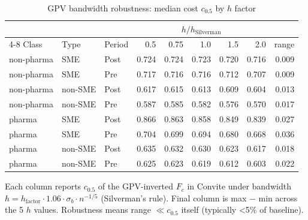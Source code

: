 \begin{table}[htbp]
\centering
\begin{threeparttable}
\caption{GPV bandwidth robustness: median cost $c_{0.5}$ by $h$ factor}
\label{tab:v3_bandwidth_grid}
\small
\begin{tabular}{lllrrrrrr}
\toprule
 & & & \multicolumn{5}{c}{$h / h_{\text{Silverman}}$} & \\
\cmidrule(lr){4-8}
Class & Type & Period & 0.5 & 0.75 & 1.0 & 1.5 & 2.0 & range \\
\midrule
non-pharma & SME & Post & 0.724 & 0.724 & 0.723 & 0.720 & 0.716 & 0.009 \\
non-pharma & SME & Pre & 0.717 & 0.716 & 0.716 & 0.712 & 0.707 & 0.009 \\
non-pharma & non-SME & Post & 0.617 & 0.615 & 0.613 & 0.609 & 0.604 & 0.013 \\
non-pharma & non-SME & Pre & 0.587 & 0.585 & 0.582 & 0.576 & 0.570 & 0.017 \\
pharma & SME & Post & 0.866 & 0.863 & 0.858 & 0.849 & 0.839 & 0.027 \\
pharma & SME & Pre & 0.704 & 0.699 & 0.694 & 0.680 & 0.668 & 0.036 \\
pharma & non-SME & Post & 0.635 & 0.632 & 0.630 & 0.623 & 0.617 & 0.018 \\
pharma & non-SME & Pre & 0.625 & 0.623 & 0.619 & 0.612 & 0.603 & 0.022 \\
\bottomrule
\end{tabular}
\begin{tablenotes}\footnotesize
\item Each column reports $c_{0.5}$ of the GPV-inverted $F_c$ in
Convite under bandwidth $h = h_{\text{factor}} \cdot
1.06 \cdot \sigma_b \cdot n^{-1/5}$ (Silverman's rule).
Final column is max $-$ min across the 5 $h$ values. Robustness
means range $\ll c_{0.5}$ itself (typically <5\% of baseline).
\end{tablenotes}
\end{threeparttable}
\end{table}
